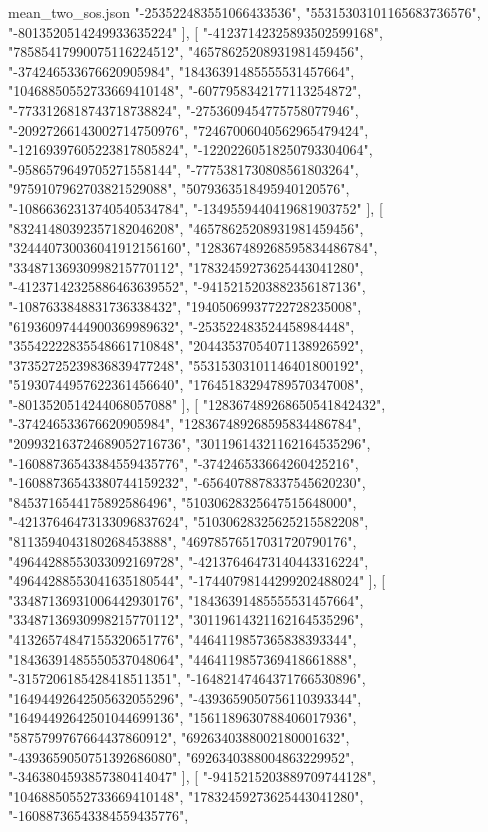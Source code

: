 \begin{filecontents*}[overwrite]{mean_two_sos.json}
    "-253522483551066433536",
    "55315303101165683736576",
    "-8013520514249933635224"
   ],
   [
    "-41237142325893502599168",
    "78585417990075116224512",
    "46578625208931981459456",
    "-374246533676620905984",
    "18436391485555531457664",
    "10468850552733669410148",
    "-6077958342177113254872",
    "-7733126818743718738824",
    "-2753609454775758077946",
    "-20927266143002714750976",
    "72467006040562965479424",
    "-12169397605223817805824",
    "-12202260518250793304064",
    "-9586579649705271558144",
    "-7775381730808561803264",
    "9759107962703821529088",
    "5079363518495940120576",
    "-10866362313740540534784",
    "-1349559440419681903752"
   ],
   [
    "83241480392357182046208",
    "46578625208931981459456",
    "324440730036041912156160",
    "128367489268595834486784",
    "33487136930998215770112",
    "17832459273625443041280",
    "-41237142325886463639552",
    "-9415215203882356187136",
    "-1087633848831736338432",
    "19405069937722728235008",
    "61936097444900369989632",
    "-253522483524458984448",
    "35542222835548661710848",
    "20443537054071138926592",
    "37352725239836839477248",
    "55315303101146401800192",
    "51930744957622361456640",
    "17645183294789570347008",
    "-8013520514244068057088"
   ],
   [
    "128367489268650541842432",
    "-374246533676620905984",
    "128367489268595834486784",
    "209932163724689052716736",
    "30119614321162164535296",
    "-16088736543384559435776",
    "-374246533664260425216",
    "-16088736543380744159232",
    "-6564078878337545620230",
    "8453716544175892586496",
    "51030628325647515648000",
    "-42137646473133096837624",
    "51030628325625215582208",
    "8113594043180268453888",
    "46978576517031720790176",
    "49644288553033092169728",
    "-42137646473140443316224",
    "49644288553041635180544",
    "-17440798144299202488024"
   ],
   [
    "33487136931006442930176",
    "18436391485555531457664",
    "33487136930998215770112",
    "30119614321162164535296",
    "41326574847155320651776",
    "4464119857365838393344",
    "18436391485550537048064",
    "4464119857369418661888",
    "-3157206185428418511351",
    "-16482147464371766530896",
    "16494492642505632055296",
    "-4393659050756110393344",
    "16494492642501044699136",
    "1561189630788406017936",
    "5875799767664437860912",
    "6926340388002180001632",
    "-4393659050751392686080",
    "6926340388004863229952",
    "-3463804593857380414047"
   ],
   [
    "-9415215203889709744128",
    "10468850552733669410148",
    "17832459273625443041280",
    "-16088736543384559435776",

\end{filecontents*}

